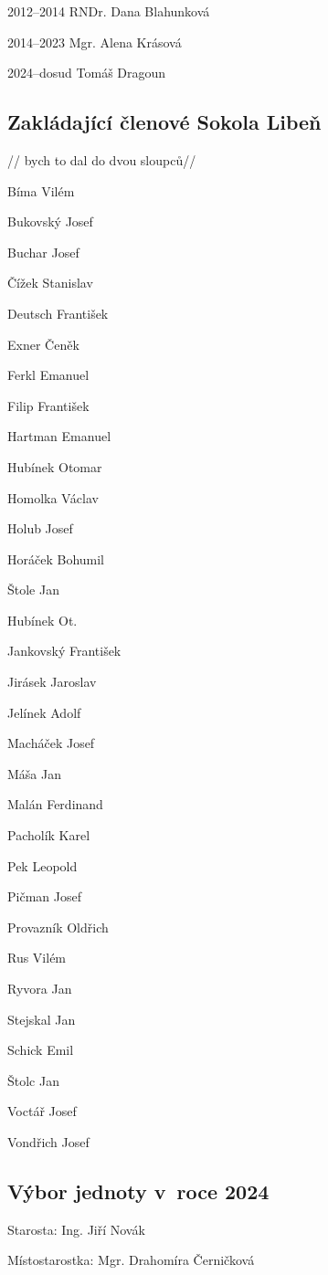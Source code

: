 \documentclass[a5paper, 12pt, twoside]{article}
\begin{document}
2012--2014 RNDr. Dana Blahunková

2014--2023 Mgr. Alena Krásová

2024--dosud Tomáš Dragoun

\subsection{Zakládající členové Sokola Libeň}

// bych to dal do dvou sloupců//

Bíma Vilém

Bukovský Josef

Buchar Josef

Čížek Stanislav

Deutsch František

Exner Čeněk

Ferkl Emanuel

Filip František

Hartman Emanuel

Hubínek Otomar

Homolka Václav

Holub Josef

Horáček Bohumil

Štole Jan

Hubínek Ot.

Jankovský František

Jirásek Jaroslav

Jelínek Adolf

Macháček Josef

Máša Jan

Malán Ferdinand

Pacholík Karel

Pek Leopold

Pičman Josef

Provazník Oldřich

Rus Vilém

Ryvora Jan

Stejskal Jan

Schick Emil

Štolc Jan

Voctář Josef

Vondřich Josef

\subsection{Výbor jednoty v~roce
2024}

Starosta: Ing. Jiří Novák

Místostarostka: Mgr. Drahomíra Černičková
\end{document}
